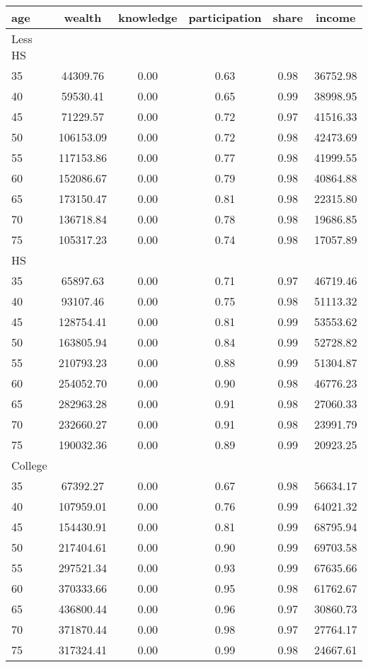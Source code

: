  \begin{tabular}{lccccc}
 \hline \hline
  age & wealth & knowledge & participation & share & income \\
 \hline
 Less HS & & & & & \\
 \hline
35 &  44309.76 &      0.00 &      0.63 &      0.98 &  36752.98 \\ 
40 &  59530.41 &      0.00 &      0.65 &      0.99 &  38998.95 \\ 
45 &  71229.57 &      0.00 &      0.72 &      0.97 &  41516.33 \\ 
50 & 106153.09 &      0.00 &      0.72 &      0.98 &  42473.69 \\ 
55 & 117153.86 &      0.00 &      0.77 &      0.98 &  41999.55 \\ 
60 & 152086.67 &      0.00 &      0.79 &      0.98 &  40864.88 \\ 
65 & 173150.47 &      0.00 &      0.81 &      0.98 &  22315.80 \\ 
70 & 136718.84 &      0.00 &      0.78 &      0.98 &  19686.85 \\ 
75 & 105317.23 &      0.00 &      0.74 &      0.98 &  17057.89 \\ 
 \hline
 HS & & & & & \\
 \hline
35 &  65897.63 &      0.00 &      0.71 &      0.97 &  46719.46 \\ 
40 &  93107.46 &      0.00 &      0.75 &      0.98 &  51113.32 \\ 
45 & 128754.41 &      0.00 &      0.81 &      0.99 &  53553.62 \\ 
50 & 163805.94 &      0.00 &      0.84 &      0.99 &  52728.82 \\ 
55 & 210793.23 &      0.00 &      0.88 &      0.99 &  51304.87 \\ 
60 & 254052.70 &      0.00 &      0.90 &      0.98 &  46776.23 \\ 
65 & 282963.28 &      0.00 &      0.91 &      0.98 &  27060.33 \\ 
70 & 232660.27 &      0.00 &      0.91 &      0.98 &  23991.79 \\ 
75 & 190032.36 &      0.00 &      0.89 &      0.99 &  20923.25 \\ 
 \hline
 College & & & & & \\
 \hline
35 &  67392.27 &      0.00 &      0.67 &      0.98 &  56634.17 \\ 
40 & 107959.01 &      0.00 &      0.76 &      0.99 &  64021.32 \\ 
45 & 154430.91 &      0.00 &      0.81 &      0.99 &  68795.94 \\ 
50 & 217404.61 &      0.00 &      0.90 &      0.99 &  69703.58 \\ 
55 & 297521.34 &      0.00 &      0.93 &      0.99 &  67635.66 \\ 
60 & 370333.66 &      0.00 &      0.95 &      0.98 &  61762.67 \\ 
65 & 436800.44 &      0.00 &      0.96 &      0.97 &  30860.73 \\ 
70 & 371870.44 &      0.00 &      0.98 &      0.97 &  27764.17 \\ 
75 & 317324.41 &      0.00 &      0.99 &      0.98 &  24667.61 \\ 
 \hline \hline
 \end{tabular}
